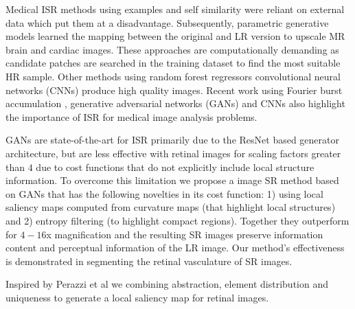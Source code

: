 \documentclass{llncs}
\begin{document}
Medical ISR methods using examples \cite{Jog8} and self similarity \cite{Jog7} were reliant on external data which put them at a disadvantage. 
%
Subsequently, parametric generative models learned the mapping between the original and LR version 
to upscale MR brain \cite{Jog9} and cardiac \cite{Oktay3} images.
%
These approaches are computationally demanding as candidate patches are searched in the training dataset to find the most suitable HR sample.
%
Other methods using random  forest regressors \cite{TannoMICCAI16}  convolutional neural networks (CNNs) \cite{SRCNN} produce high quality images. Recent work using Fourier burst accumulation \cite{Jog}, generative adversarial networks (GANs) \cite{Srgan} and CNNs \cite{Oktay} also highlight the importance of ISR for medical image analysis problems.

GANs \cite{Srgan} are state-of-the-art for ISR primarily due to the ResNet based  generator architecture, but are less effective with retinal images for scaling factors greater than $4$ due to cost functions that do not explicitly include local structure information. To overcome this limitation we propose a image SR method based on GANs that has the following novelties in its cost function: 1) using local saliency maps computed from curvature maps (that highlight local structures) and 2) entropy filtering (to highlight compact regions). Together they outperform \cite{Srgan} for $4-16$x magnification and the resulting SR images preserve information content and perceptual information of the LR image.
%
Our method's effectiveness is demonstrated in segmenting the retinal vasculature of SR images.



%
Inspired by Perazzi et al \cite{Perazzi_CVPR} we combining abstraction, element distribution and uniqueness to generate a local saliency map for retinal images. 
\end{document}
